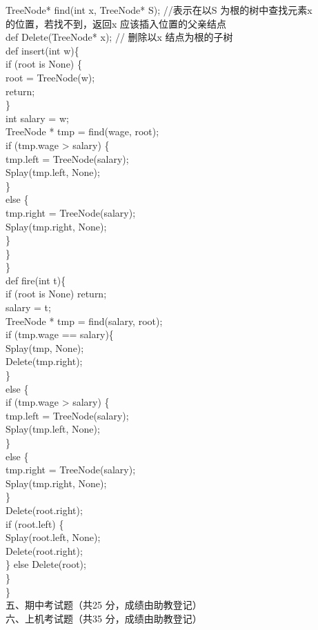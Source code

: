 \begin{question}
TreeNode* find(int x, TreeNode* S);  //表示在以S 为根的树中查找元素x\\
的位置，若找不到，返回x 应该插入位置的父亲结点\\
def Delete(TreeNode* x); // 删除以x 结点为根的子树\\
def insert(int w)\{\\
if (root is None) \{\\
root = TreeNode(w);\\
return;\\
\}\\
int salary = w;\\
TreeNode * tmp = find(wage, root);\\
if (tmp.wage > salary) \{\\
tmp.left = TreeNode(salary);\\
Splay(tmp.left, None);\\
\}\\
else \{\\
tmp.right = TreeNode(salary);\\
Splay(tmp.right, None);\\
\}\\
\}\\
\}\\
def fire(int t)\{\\
if (root is None) return;\\
salary = t;\\
TreeNode * tmp = find(salary, root);\\
if (tmp.wage == salary)\{\\
Splay(tmp, None);\\
Delete(tmp.right);\\
\}\\
else \{\\
if (tmp.wage > salary) \{\\
tmp.left = TreeNode(salary);\\
Splay(tmp.left, None);\\
\}\\
else \{\\
tmp.right = TreeNode(salary);\\
Splay(tmp.right, None);\\
\}\\
Delete(root.right);\\
if (root.left) \{\\
Splay(root.left, None);\\
Delete(root.right);\\
\} else Delete(root);\\
\}\\
\}\\
五、期中考试题（共25 分，成绩由助教登记）\\
六、上机考试题（共35 分，成绩由助教登记）\\
\\
\


\end{question}
